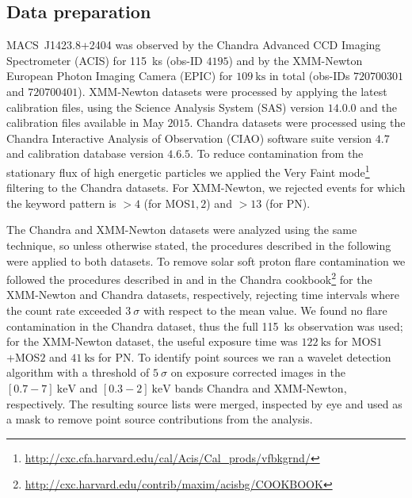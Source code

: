 \documentclass[twocolumn,traditabstract]{aa}
\begin{document}
\subsection{Data preparation}
\mbox{MACS~J1423.8+2404} was observed by the Chandra Advanced CCD Imaging Spectrometer (ACIS) for \SI{115}{\kilo\second} (obs-ID $4195$) and by the XMM-Newton European Photon Imaging Camera (EPIC) for $\SI{109}{\kilo\second}$ in total (obs-IDs $720700301$ and $720700401$). XMM-Newton datasets were processed by applying the latest calibration files, using the Science Analysis System (SAS) version $14.0.0$ and the calibration files available in May $2015$. Chandra datasets were processed using the Chandra Interactive Analysis of Observation (CIAO) software suite version $4.7$ and calibration database version $4.6.5$. To reduce contamination from the stationary flux of high energetic particles we applied the Very Faint mode\footnote{\label{fn1}\url{http://cxc.cfa.harvard.edu/cal/Acis/Cal\_prods/vfbkgrnd/}} filtering to the Chandra datasets. For XMM-Newton, we rejected events for which the keyword {\sc pattern}  is $> 4$ (for MOS$1,2$) and $>13$ (for PN). %

The Chandra and XMM-Newton datasets were analyzed using the same technique, so unless otherwise stated, the procedures described in the following were applied to both datasets. To remove solar soft proton flare contamination we followed the procedures described in \cite{pratt2007} and in the Chandra {\sc cookbook}\footnote{\label{fn2}\url{http://cxc.harvard.edu/contrib/maxim/acisbg/COOKBOOK}} for the XMM-Newton and Chandra datasets, respectively, rejecting time intervals where the count rate exceeded $3 \ \sigma$ with respect to the mean value. We found no flare contamination in the Chandra dataset, thus the full 115~ks observation was used; for the XMM-Newton dataset, the useful exposure time was $\SI{122}{\kilo\second}$ for MOS$1$+MOS$2$ and $\SI{41}{\kilo\second}$ for PN. To identify point sources we ran a wavelet detection algorithm with a threshold of $5 \ \sigma$ on exposure corrected images in the $[0.7-7] \ \si{\kilo\electronvolt}$ and $[0.3-2] \ \si{\kilo\electronvolt}$ bands Chandra and XMM-Newton, respectively. The resulting source lists were merged, inspected by eye and used as a mask to remove point source contributions from the analysis.

\end{document}
